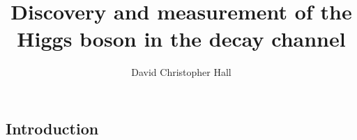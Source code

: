 \documentclass[hyper,allcolors=blue]{mythesis}  %
\title{Discovery and measurement of the Higgs boson in the \WW decay channel}
\author{David Christopher Hall}
\begin{document}
\begin{frontmatter}
  
\end{frontmatter}

\begin{mainmatter}
  \clearpage
  
  \chapter*{Introduction}
    \label{chap:intro}
    

  
  
  
  
  
  
  
  
  
  
\end{mainmatter}
\end{document}
